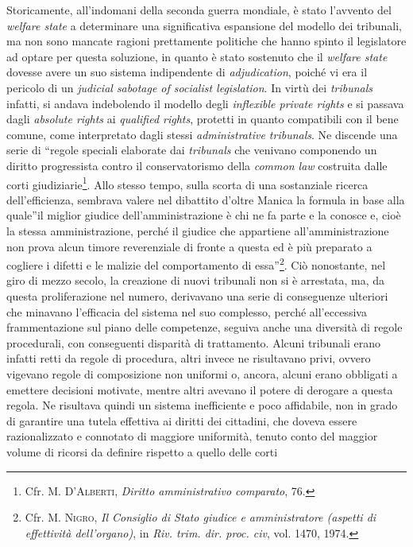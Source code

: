 \documentclass[12pt,it,a4paper,]{report}
\begin{document}
Storicamente, all'indomani della seconda guerra mondiale, è stato
l'avvento del \emph{welfare state} a determinare una significativa
espansione del modello dei tribunali, ma non sono mancate ragioni
prettamente politiche che hanno spinto il legislatore ad optare per
questa soluzione, in quanto è stato sostenuto che il \emph{welfare
state} dovesse avere un suo sistema indipendente di \emph{adjudication},
poiché vi era il pericolo di un \emph{judicial sabotage of socialist
legislation}. In virtù dei \emph{tribunals} infatti, si andava
indebolendo il modello degli \emph{inflexible private rights} e si
passava dagli \emph{absolute rights} ai \emph{qualified rights},
protetti in quanto compatibili con il bene comune, come interpretato
dagli stessi \emph{administrative tribunals}. Ne discende una serie di
``regole speciali elaborate dai \emph{tribunals} che venivano componendo
un diritto progressista contro il conservatorismo della \emph{common
law} costruita dalle corti giudiziarie\footnote{Cfr. M.
  \textsc{D'Alberti}, \emph{Diritto amministrativo comparato}, 76.}.
Allo stesso tempo, sulla scorta di una sostanziale ricerca
dell'efficienza, sembrava valere nel dibattito d'oltre Manica la formula
in base alla quale''il miglior giudice dell'amministrazione è chi ne fa
parte e la conosce e, cioè la stessa amministrazione, perché il giudice
che appartiene all'amministrazione non prova alcun timore reverenziale
di fronte a questa ed è più preparato a cogliere i difetti e le malizie
del comportamento di essa''\footnote{Cfr. M. \textsc{Nigro}, \emph{Il
  Consiglio di Stato giudice e amministratore (aspetti di effettività
  dell'organo)}, in \emph{Riv. trim. dir. proc. civ}, vol. 1470, 1974.}.
Ciò nonostante, nel giro di mezzo secolo, la creazione di nuovi
tribunali non si è arrestata, ma, da questa proliferazione nel numero,
derivavano una serie di conseguenze ulteriori che minavano l'efficacia
del sistema nel suo complesso, perché all'eccessiva frammentazione sul
piano delle competenze, seguiva anche una diversità di regole
procedurali, con conseguenti disparità di trattamento. Alcuni tribunali
erano infatti retti da regole di procedura, altri invece ne risultavano
privi, ovvero vigevano regole di composizione non uniformi o, ancora,
alcuni erano obbligati a emettere decisioni motivate, mentre altri
avevano il potere di derogare a questa regola. Ne risultava quindi un
sistema inefficiente e poco affidabile, non in grado di garantire una
tutela effettiva ai diritti dei cittadini, che doveva essere
razionalizzato e connotato di maggiore uniformità, tenuto conto del
maggior volume di ricorsi da definire rispetto a quello delle corti
\end{document}
